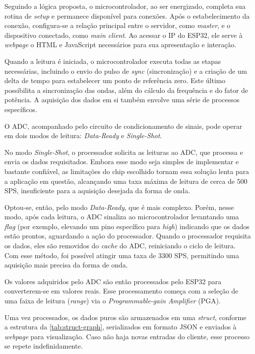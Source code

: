 Seguindo a lógica proposta, o microcontrolador, ao ser energizado, completa sua rotina de \textit{setup} e permanece disponível para conexões. Após o estabelecimento da conexão, configura-se a relação principal entre o servidor, como \textit{master}, e o dispositivo conectado, como \textit{main client}. Ao acessar o IP do ESP32, ele serve à \textit{webpage} o HTML e JavaScript necessários para sua apresentação e interação.

Quando a leitura é iniciada, o microcontrolador executa todas as etapas necessárias, incluindo o envio do pulso de \textit{sync} (sincronização) e a criação de um delta de tempo para estabelecer um ponto de referência zero. Este último possibilita a sincronização das ondas, além do cálculo da frequência e do fator de potência. A aquisição dos dados em si também envolve uma série de processos específicos.

O \gls{ADC}, acompanhado pelo circuito de condicionamento de sinais, pode operar em dois modos de leitura: \textit{Data-Ready} e \textit{Single-Shot}.

No modo \textit{Single-Shot}, o processador solicita as leituras ao \gls{ADC}, que processa e envia os dados requisitados. Embora esse modo seja simples de implementar e bastante confiável, as limitações do chip escolhido tornam essa solução lenta para a aplicação em questão, alcançando uma taxa máxima de leitura de cerca de 500 \gls{SPS}, insuficiente para a aquisição desejada da forma de onda.

Optou-se, então, pelo modo \textit{Data-Ready}, que é mais complexo. Porém, nesse modo, após cada leitura, o \gls{ADC} sinaliza ao microcontrolador levantando uma \textit{flag} (por exemplo, elevando um pino específico para \textit{high}) indicando que os dados estão prontos, aguardando a ação do processador. Quando o processador requisita os dados, eles são removidos do \textit{cache} do \gls{ADC}, reiniciando o ciclo de leitura. Com esse método, foi possível atingir uma taxa de 3300 \gls{SPS}, permitindo uma aquisição mais precisa da forma de onda.

Os valores adquiridos pelo \gls{ADC} são então processados pelo ESP32 para converterem-se em valores reais. Esse processamento começa com a seleção de uma faixa de leitura (\textit{range}) via o \textit{Programmable-gain Amplifier} (\gls{PGA}).

Uma vez processados, os dados puros são armazenados em uma \textit{struct}, conforme a estrutura da \autoref{tab:struct-graph}, serializados em formato JSON e enviados à \textit{webpage} para visualização. Caso não haja novas entradas do cliente, esse processo se repete indefinidamente.

